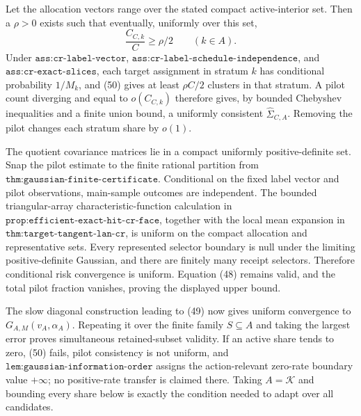 Let the allocation vectors range over the stated compact active-interior set.  Then a \(\rho>0\) exists such that eventually, uniformly over this set,
\[
\frac{C_{C,k}}C\geq\rho/2\qquad(k\in A). \tag{50}
\]
Under \(\texttt{ass:cr-label-vector}\), \(\texttt{ass:cr-label-schedule-independence}\), and \(\texttt{ass:cr-exact-slices}\), each target assignment in stratum \(k\) has conditional probability \(1/M_k\), and (50) gives at least \(\rho C/2\) clusters in that stratum.  A pilot count diverging and equal to \(o(C_{C,k})\) therefore gives, by bounded Chebyshev inequalities and a finite union bound, a uniformly consistent \(\widehat\Sigma_{C,A}\).  Removing the pilot changes each stratum share by \(o(1)\).

The quotient covariance matrices lie in a compact uniformly positive-definite set.  Snap the pilot estimate to the finite rational partition from \(\texttt{thm:gaussian-finite-certificate}\).  Conditional on the fixed label vector and pilot observations, main-sample outcomes are independent.  The bounded triangular-array characteristic-function calculation in \(\texttt{prop:efficient-exact-hit-cr-face}\), together with the local mean expansion in \(\texttt{thm:target-tangent-lan-cr}\), is uniform on the compact allocation and representative sets.  Every represented selector boundary is null under the limiting positive-definite Gaussian, and there are finitely many receipt selectors.  Therefore conditional risk convergence is uniform.  Equation (48) remains valid, and the total pilot fraction vanishes, proving the displayed upper bound.

The slow diagonal construction leading to (49) now gives uniform convergence to \(G_{A,M}(v_A,\alpha_A)\).  Repeating it over the finite family \(S\subseteq A\) and taking the largest error proves simultaneous retained-subset validity.  If an active share tends to zero, (50) fails, pilot consistency is not uniform, and \(\texttt{lem:gaussian-information-order}\) assigns the action-relevant zero-rate boundary value \(+\infty\); no positive-rate transfer is claimed there.  Taking \(A=\mathcal K\) and bounding every share below is exactly the condition needed to adapt over all candidates.